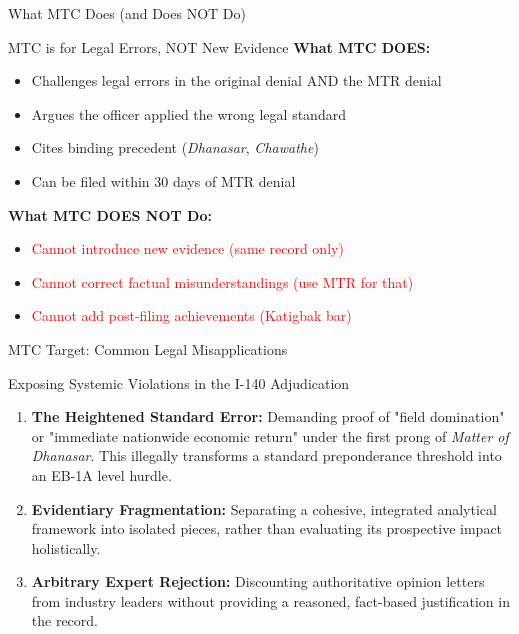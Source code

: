 \documentclass[11pt]{beamer}
\begin{document}
	\begin{frame}{What MTC Does (and Does NOT Do)}
		\scriptsize
		\begin{block}{MTC is for Legal Errors, NOT New Evidence}
			\textbf{What MTC DOES:}
			\begin{itemize}
				\item Challenges legal errors in the original denial AND the MTR denial
				\item Argues the officer applied the wrong legal standard
				\item Cites binding precedent (\textit{Dhanasar}, \textit{Chawathe})
				\item Can be filed within 30 days of MTR denial
			\end{itemize}
			\textbf{What MTC DOES NOT Do:}
			\begin{itemize}
				\item \textcolor{red}{Cannot introduce new evidence (same record only)}
				\item \textcolor{red}{Cannot correct factual misunderstandings (use MTR for that)}
				\item \textcolor{red}{Cannot add post-filing achievements (Katigbak bar)}
			\end{itemize}
		\end{block}
	\end{frame}
	
	\begin{frame}{MTC Target: Common Legal Misapplications}
		\scriptsize
		\begin{block}{Exposing Systemic Violations in the I-140 Adjudication}
			\begin{enumerate}
				\item \textbf{The Heightened Standard Error:} Demanding proof of "field domination" or "immediate nationwide economic return" under the first prong of \textit{Matter of Dhanasar}. This illegally transforms a standard preponderance threshold into an EB-1A level hurdle.
				\item \textbf{Evidentiary Fragmentation:} Separating a cohesive, integrated analytical framework into isolated pieces, rather than evaluating its prospective impact holistically.
				\item \textbf{Arbitrary Expert Rejection:} Discounting authoritative opinion letters from industry leaders without providing a reasoned, fact-based justification in the record.
			\end{enumerate}
		\end{block}
	\end{frame}
	
\end{document}
